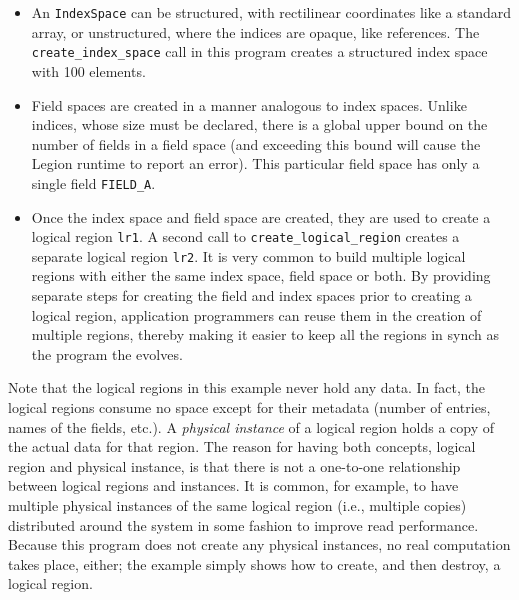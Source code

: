 \documentclass[11pt]{book}
\begin{document}
\begin{itemize}

\item An {\tt IndexSpace} can be structured, with rectilinear coordinates like a standard
array, or unstructured, where the indices are opaque, like references.  The {\tt create\_index\_space}
call in this program creates a structured index space with 100 elements.

\item Field spaces are created in a manner analogous to index spaces.
  Unlike indices, whose size must be declared, there is a global upper
  bound on the number of fields in a field space (and exceeding this bound will cause
  the Legion runtime to report an error).  This particular
  field space has only a single field {\tt FIELD\_A}.

\item Once the index space and field space are created, they are used to create
a logical region {\tt lr1}.  A second call to {\tt create\_logical\_region}
creates a separate logical region {\tt lr2}.  It is very common to build
multiple logical regions with either the same index space, field space or both.
By providing separate steps for creating the field and index spaces prior to creating
a logical region, application programmers can reuse them in the creation of multiple
regions, thereby making it easier to keep all the regions in synch as the program the
evolves.
\end{itemize}

Note that the logical regions in this example never hold any data.  In
fact, the logical regions consume no space except for their metadata
(number of entries, names of the fields, etc.).  A {\em physical
  instance} of a logical region holds a copy of the actual data for
that region.  The reason for having both concepts, logical region and
physical instance, is that there is not a one-to-one relationship
between logical regions and instances.  It is common, for example, to
have multiple physical instances of the same logical region (i.e.,
multiple copies) distributed around the system in some fashion to
improve read performance.  Because this program does not create any
physical instances, no real computation takes place, either; the
example simply shows how to create, and then destroy, a logical
region.
\end{document}
